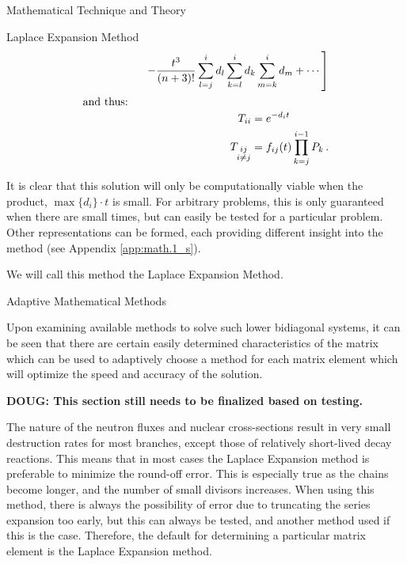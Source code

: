 \begin{chapter}{Mathematical Technique and Theory}
\begin{section}{Laplace Expansion Method}
\begin{align}
\begin{split}
      &\phantom{= t^{n-1} \left[\right.}
      \left.\quad\quad-\frac{t^3}{(n+3)!}\sum_{l=j}^{i}d_l \sum_{k=l}^i d_k \sum_{m=k}^i d_m 
        +\cdots \right ]\label{eqn:math.expansion.final}\\
    \end{split}\\
    \intertext{and thus:}
    \begin{split}
      T_{ii} &= e^{-d_i t}\\
      T_{\substack{ij\\i\neq j}} &= f_{ij}(t)\prod_{k=j}^{i-1}P_k \, .\\
    \end{split}
  \end{align}
  
  It is clear that this solution will only be computationally viable
  when the product, $\max \{d_i\} \cdot t$ is small.  For arbitrary
  problems, this is only guaranteed when there are small times, but
  can easily be tested for a particular problem.  Other
  representations can be formed, each providing different insight into
  the method (see Appendix \ref{app:math.1_s}).
    
  We will call this method the Laplace Expansion Method.

\end{section}

\begin{section}{Adaptive Mathematical Methods\label{sec:math.adaptive}}
  
  Upon examining available methods to solve such lower bidiagonal
  systems, it can be seen that there are certain easily determined
  characteristics of the matrix which can be used to adaptively choose
  a method for each matrix element which will optimize the speed and
  accuracy of the solution.
  
  \textbf{DOUG: This section still needs to be finalized based on
    testing.}
  
  The nature of the neutron fluxes and nuclear cross-sections result
  in very small destruction rates for most branches, except those of
  relatively short-lived decay reactions.  This means that in most
  cases the Laplace Expansion method is preferable to minimize the
  round-off error.  This is especially true as the chains become
  longer, and the number of small divisors increases.  When using this
  method, there is always the possibility of error due to truncating
  the series expansion too early, but this can always be tested, and
  another method used if this is the case.  Therefore, the default for
  determining a particular matrix element is the Laplace Expansion
  method.
  

\end{section}
\end{chapter}
